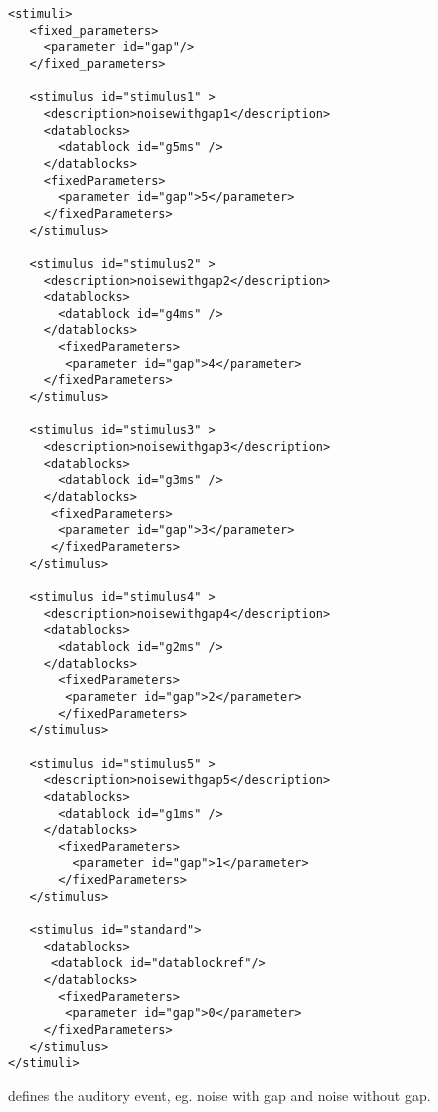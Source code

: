 \begin{lstlisting}
<stimuli>
   <fixed_parameters>
     <parameter id="gap"/>
   </fixed_parameters>

   <stimulus id="stimulus1" >
     <description>noisewithgap1</description>
     <datablocks>
       <datablock id="g5ms" />
     </datablocks>
     <fixedParameters>
       <parameter id="gap">5</parameter>
     </fixedParameters>
   </stimulus>

   <stimulus id="stimulus2" >
     <description>noisewithgap2</description>
     <datablocks>
       <datablock id="g4ms" />
     </datablocks>
       <fixedParameters>
        <parameter id="gap">4</parameter>
     </fixedParameters>
   </stimulus>

   <stimulus id="stimulus3" >
     <description>noisewithgap3</description>
     <datablocks>
       <datablock id="g3ms" />
     </datablocks>
      <fixedParameters>
       <parameter id="gap">3</parameter>
      </fixedParameters>
   </stimulus>

   <stimulus id="stimulus4" >
     <description>noisewithgap4</description>
     <datablocks>
       <datablock id="g2ms" />
     </datablocks>
       <fixedParameters>
        <parameter id="gap">2</parameter>
       </fixedParameters>
   </stimulus>

   <stimulus id="stimulus5" >
     <description>noisewithgap5</description>
     <datablocks>
       <datablock id="g1ms" />
     </datablocks>
       <fixedParameters>
         <parameter id="gap">1</parameter>
       </fixedParameters>
   </stimulus>

   <stimulus id="standard">
     <datablocks>
      <datablock id="datablockref"/>
     </datablocks>
       <fixedParameters>
        <parameter id="gap">0</parameter>
     </fixedParameters>
   </stimulus>
</stimuli>
\end{lstlisting}


 defines the auditory event, eg. noise with gap
and noise without gap.


